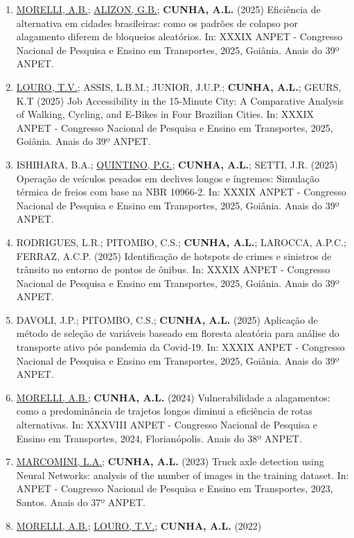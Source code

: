 \documentclass[
  brazilian,
  11pt,
  a4paper,
]{article}
\begin{document}
\begin{enumerate}
\def\labelenumi{\arabic{enumi}.}
\item
  \ul{MORELLI, A.B.}; \ul{ALIZON, G.B.}; \textbf{CUNHA, A.L.} (2025)
  Eficiência de alternativa em cidades brasileiras: como os padrões de
  colapso por alagamento diferem de bloqueios aleatórios. In: XXXIX
  ANPET - Congresso Nacional de Pesquisa e Ensino em Transportes, 2025,
  Goiânia. Anais do 39º ANPET.
\item
  \ul{LOURO, T.V.}; ASSIS, L.B.M.; JUNIOR, J.U.P.; \textbf{CUNHA, A.L.};
  GEURS, K.T (2025) Job Accessibility in the 15-Minute City: A
  Comparative Analysis of Walking, Cycling, and E-Bikes in Four
  Brazilian Cities. In: XXXIX ANPET - Congresso Nacional de Pesquisa e
  Ensino em Transportes, 2025, Goiânia. Anais do 39º ANPET.
\item
  ISHIHARA, B.A.; \ul{QUINTINO, P.G.}; \textbf{CUNHA, A.L.}; SETTI, J.R.
  (2025) Operação de veículos pesados em declives longos e íngremes:
  Simulação térmica de freios com base na NBR 10966-2. In: XXXIX ANPET -
  Congresso Nacional de Pesquisa e Ensino em Transportes, 2025, Goiânia.
  Anais do 39º ANPET.
\item
  RODRIGUES, L.R.; PITOMBO, C.S.; \textbf{CUNHA, A.L.}; LAROCCA, A.P.C.;
  FERRAZ, A.C.P. (2025) Identificação de hotspots de crimes e sinistros
  de trânsito no entorno de pontos de ônibus. In: XXXIX ANPET -
  Congresso Nacional de Pesquisa e Ensino em Transportes, 2025, Goiânia.
  Anais do 39º ANPET.
\item
  DAVOLI, J.P.; PITOMBO, C.S.; \textbf{CUNHA, A.L.} (2025) Aplicação de
  método de seleção de variáveis baseado em floresta aleatória para
  análise do transporte ativo pós pandemia da Covid-19. In: XXXIX ANPET
  - Congresso Nacional de Pesquisa e Ensino em Transportes, 2025,
  Goiânia. Anais do 39º ANPET.
\item
  \ul{MORELLI, A.B.}; \textbf{CUNHA, A.L.} (2024) Vulnerabilidade a
  alagamentos: como a predominância de trajetos longos diminui a
  eficiência de rotas alternativas. In: XXXVIII ANPET - Congresso
  Nacional de Pesquisa e Ensino em Transportes, 2024, Florianópolis.
  Anais do 38º ANPET.
\item
  \ul{MARCOMINI, L.A.}; \textbf{CUNHA, A.L.} (2023) Truck axle detection
  using Neural Networks: analysis of the number of images in the
  training dataset. In: ANPET - Congresso Nacional de Pesquisa e Ensino
  em Transportes, 2023, Santos. Anais do 37º ANPET.
\item
  \ul{MORELLI, A.B.}; \ul{LOURO, T.V.}; \textbf{CUNHA, A.L.} (2022)

\end{enumerate}
\end{document}
